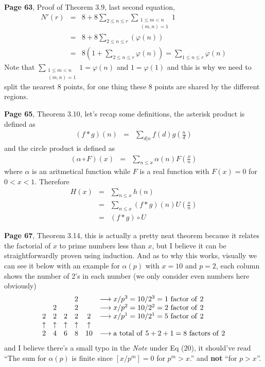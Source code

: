 \documentclass[aps,preprint,preprintnumbers,nofootinbib,showpacs,prd]{revtex4-1}
\newcommand{\nbea}{\begin{eqnarray*}}
\newcommand{\neea}{\end{eqnarray*}}
\begin{document}
{\bf Page 63}, Proof of Theorem 3.9, last second equation,
%
\nbea
N'(r) & = & 8 + 8\sum_{2 \le n \le r}\sum_{\substack{1 \le m < n \\ (m,n) = 1}} 1 \\
& = & 8 + 8\sum_{2 \le n \le r}\left (\varphi(n) \right ) \\
& = & 8 \left ( 1 + \sum_{2 \le n \le r}\varphi(n) \right ) = \sum_{1 \le n \le r}\varphi(n)
\neea
%
Note that $\sum_{\substack{1 \le m < n \\ (m,n) = 1}} 1 = \varphi(n)$ and $1 = \varphi(1)$ and this is why we need to split the nearest 8 points, for one thing these 8 points are shared by the different regions.

{\bf Page 65}, Theorem 3.10, let's recap some definitions, the asterisk product is defined as
%
\nbea
(f * g)(n) & = & \sum_{d|n} f(d) g\left(\frac{n}{d}\right)
\neea
%
and the circle product is defined as
%
\nbea
\left ( \alpha \circ F \right ) (x) & = & \sum_{n\le x}\alpha(n) F\left ( \frac{x}{n}\right )
\neea
%
where $\alpha$ is an aritmetical function while $F$ is a real function with $F(x) = 0$ for $0 < x < 1$. Therefore
%
\nbea
H(x) & = & \sum_{n \le x}h(n) \\
& = & \sum_{n \le x} (f * g)(n) U\left ( \frac{x}{n}\right ) \\
& = & (f * g) \circ U
\neea
%

{\bf Page 67}, Theorem 3.14, this is actually a pretty neat theorem because it relates the factorial of $x$ to prime numbers less than $x$, but I believe it can be straightforwardly proven using induction. And as to why this works, visually we can see it below with an example for  $\alpha(p)$ with $x=10$ and $p=2$, each column shows the number of 2's in each number (we only consider even numbers here obviously)
%
\nbea
\begin{array}{c c c c c l}
   &    &   & 2  &  & \longrightarrow x/p^3 = 10/2^3 = 1 {\rm~factor~of~} 2\\
   & 2 &    & 2 &   & \longrightarrow x/p^2 = 10/2^2 = 2 {\rm~factor~of~} 2\\
2 & 2 & 2 & 2 & 2 & \longrightarrow x/p^1 = 10/2^1 = 5 {\rm~factor~of~} 2\\
\uparrow & \uparrow & \uparrow & \uparrow & \uparrow \\
2 & 4 & 6 & 8 & 10 & \longrightarrow {\rm a~total~of~}5+2+1=8{\rm~factors~of~}2
\end{array}
\neea
%
and I believe there's a small typo in the {\it Note} under Eq (20), it should've read ``The sum for $\alpha(p)$ is finite since $\left \lbrack x/p^m\right \rbrack = 0$ for $p^m>x$.'' and {\bf not} ``for $p > x$''.
\end{document}
